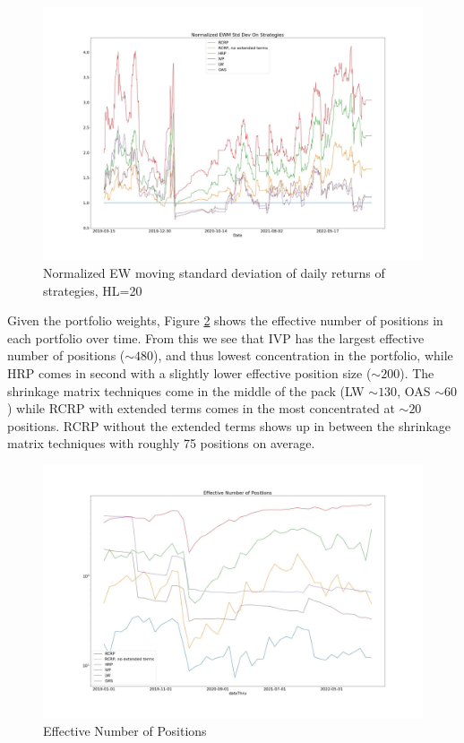 \documentclass[10pt,twoside,titlepage]{article}   %
\begin{document}
\noindent
\begin{figure}[H]
\includegraphics[width = 1.00\textwidth]{image2.jpg}
\vspace{-1.75\baselineskip}
\caption{Normalized EW moving standard deviation of daily returns of strategies, HL=20}
\label{fig2}
\end{figure}

Given the portfolio weights, Figure \ref{fig3} shows the effective number of positions in each portfolio over time. 
From this we see that IVP has the largest effective number of positions ($\sim 480$), and thus lowest concentration in the portfolio, 
while HRP comes in second with a slightly lower effective position size ($\sim 200$). 
The shrinkage matrix techniques come in the middle of the pack (LW $\sim 130$, OAS $\sim 60$) 
while RCRP with extended terms comes in the most concentrated at $\sim 20$ positions. 
RCRP without the extended terms shows up in between the shrinkage matrix techniques with roughly 75 positions on average.

\noindent
\begin{figure}[!h]
\includegraphics[width = 1.0\textwidth]{image3.jpg}
\vspace{-1.75\baselineskip}
\caption{Effective Number of Positions}
\label{fig3}
\end{figure}
\end{document}
